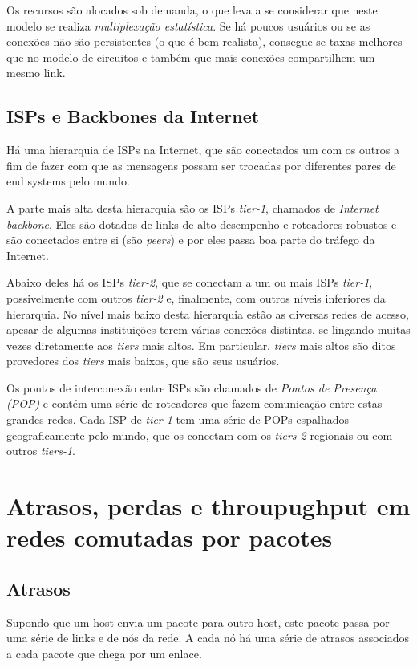 Os recursos são alocados sob demanda, o que leva a se considerar que neste modelo se realiza \emph{multiplexação estatística}.
Se há poucos usuários ou se as conexões não são persistentes (o que é bem realista), consegue-se taxas melhores que no modelo de circuitos e também que mais conexões compartilhem um mesmo link.

\subsection{ISPs e Backbones da Internet}

Há uma hierarquia de ISPs na Internet, que são conectados um com os outros a fim de fazer com que as mensagens possam ser trocadas por diferentes pares de end systems pelo mundo.

A parte mais alta desta hierarquia são os ISPs \emph{tier-1}, chamados de \emph{Internet backbone}.
Eles são dotados de links de alto desempenho e roteadores robustos e são conectados entre si (são \emph{peers}) e por eles passa boa parte do tráfego da Internet.

Abaixo deles há os ISPs \emph{tier-2}, que se conectam a um ou mais ISPs \emph{tier-1}, possivelmente com outros \emph{tier-2} e, finalmente, com outros níveis inferiores da hierarquia.
No nível mais baixo desta hierarquia estão as diversas redes de acesso, apesar de algumas instituições terem várias conexões distintas, se lingando muitas vezes diretamente aos \emph{tiers} mais altos.
Em particular, \emph{tiers} mais altos são ditos provedores dos \emph{tiers} mais baixos, que são seus usuários.

Os pontos de interconexão entre ISPs são chamados de \emph{Pontos de Presença (POP)} e contém uma série de roteadores que fazem comunicação entre estas grandes redes.
Cada ISP de \emph{tier-1} tem uma série de POPs espalhados geograficamente pelo mundo, que os conectam com os \emph{tiers-2} regionais ou com outros \emph{tiers-1}.

\section{Atrasos, perdas e throupughput em redes comutadas por pacotes}

\subsection{Atrasos}

Supondo que um host envia um pacote para outro host, este pacote passa por uma série de links e de nós da rede.
A cada nó há uma série de atrasos associados a cada pacote que chega por um enlace.

